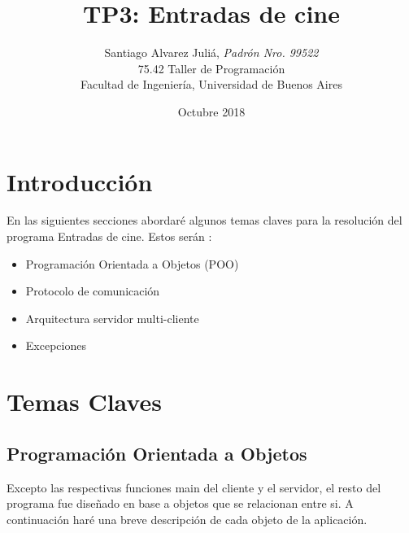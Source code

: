 \documentclass[a4paper,12pt]{report}
\title{TP3: Entradas de cine}
\author{Santiago Alvarez Juli\'a, \textit{Padr\'on Nro. 99522}                     \\
            \normalsize{75.42 Taller de Programaci\'on}                             \\
            \normalsize{Facultad de Ingenier\'ia, Universidad de Buenos Aires}            \\
       }
\date{Octubre 2018}
\begin{document}
\maketitle

\thispagestyle{empty}

\tableofcontents
\newpage
{}

\section{Introducci\'on}

En las siguientes secciones abordar\'e algunos temas claves para la resoluci\'on del programa Entradas de cine. Estos ser\'an :

\begin{itemize}
\item Programaci\'on Orientada a Objetos (POO)
\item Protocolo de comunicaci\'on
\item Arquitectura servidor multi-cliente
\item Excepciones
\end{itemize}

\section{Temas Claves}

\subsection{Programaci\'on Orientada a Objetos}

Excepto las respectivas funciones main del cliente y el servidor, el resto del programa fue dise\~nado en base a objetos que se relacionan entre si. A continuaci\'on har\'e una breve descripci\'on de cada objeto de la aplicaci\'on.
\end{document}
